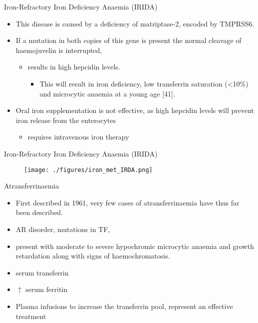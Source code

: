 \documentclass[presentation, smaller]{beamer}
\begin{document}
\begin{frame}[label={sec:orge22486c}]{Iron-Refractory Iron Deficiency Anaemia (IRIDA)}
\begin{itemize}
\item This disease is caused by a deficiency of matriptase-2, encoded by TMPRSS6.
\item If a mutation in both copies of this gene is present the normal cleavage of haemojuvelin is interrupted,
\begin{itemize}
\item results in high hepcidin levels.
\begin{itemize}
\item This will result in iron deficiency, low transferrin saturation
(<10\%) and microcytic anaemia at a young age [41].
\end{itemize}
\end{itemize}
\item Oral iron supplementation is not effective, as high hepcidin
levels will prevent iron release from the enterocytes
\begin{itemize}
\item requires intravenous iron therapy
\end{itemize}
\end{itemize}
\end{frame}

\begin{frame}[label={sec:org44de9c8}]{Iron-Refractory Iron Deficiency Anaemia (IRIDA)}
\begin{figure}[htbp]
\centering
\texttt{[image: ./figures/iron\_met\_IRDA.png]}
\label{fig:org5102803}
\end{figure}
\end{frame}

\begin{frame}[label={sec:org225a5c0}]{Atransferrinaemia}
\begin{itemize}
\item First described in 1961, very few cases of atransferrinaemia have thus far been described.
\item AR disorder, mutations in TF,
\item present with moderate to severe hypochromic microcytic anaemia and growth retardation along with signs of haemochromatosis.
\item \downarrown serum transferrin
\item \(\uparrow\) serum ferritin
\item Plasma infusions to increase the transferrin pool, represent an
effective treatment
\end{itemize}
\end{frame}
\end{document}
